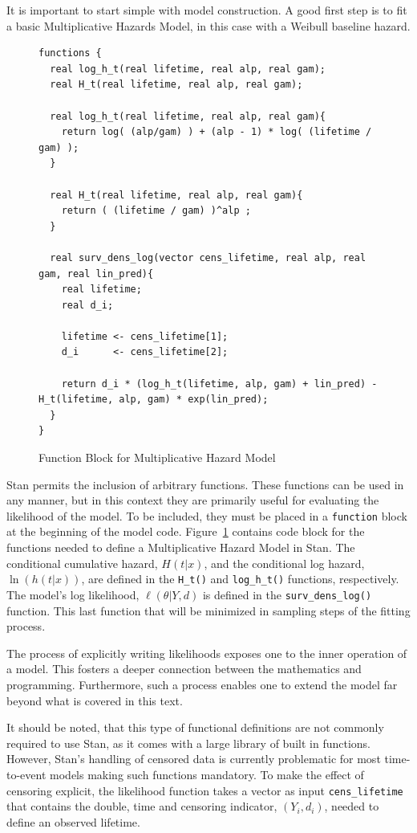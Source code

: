It is important to start simple with model construction. A good first step is to fit a basic Multiplicative Hazards Model, in this case with a Weibull baseline hazard. 

\begin{figure}[htbp]
    \centering
    \begin{lstlisting}[belowskip=-2 \baselineskip]
functions {
  real log_h_t(real lifetime, real alp, real gam);
  real H_t(real lifetime, real alp, real gam);
 
  real log_h_t(real lifetime, real alp, real gam){
    return log( (alp/gam) ) + (alp - 1) * log( (lifetime / gam) );
  }
  
  real H_t(real lifetime, real alp, real gam){
    return ( (lifetime / gam) )^alp ;
  }
  
  real surv_dens_log(vector cens_lifetime, real alp, real gam, real lin_pred){
    real lifetime;
    real d_i;
  
    lifetime <- cens_lifetime[1];
    d_i      <- cens_lifetime[2];
  
    return d_i * (log_h_t(lifetime, alp, gam) + lin_pred) - H_t(lifetime, alp, gam) * exp(lin_pred);
  }
}\end{lstlisting}
    \caption{Function Block for Multiplicative Hazard Model}
    \label{mhazm_funs}
\end{figure}


Stan permits the inclusion of arbitrary functions. These functions can be used in any manner, but in this context they are primarily useful for evaluating the likelihood of the model. To be included, they must be placed in a \lstinline{function} block at the beginning of the model code. Figure~\ref{mhazm_funs} contains code block for the functions needed to define a Multiplicative Hazard Model in Stan. The conditional cumulative hazard, $H(t|x)$, and the conditional log hazard, $\ln(h(t|x))$, are defined in the \lstinline{H_t()} and \lstinline{log_h_t()} functions, respectively. The model's log likelihood, $\ell(\theta|Y, d)$ is defined in the \lstinline{surv_dens_log()} function. This last function that will be minimized in sampling steps of the fitting process. 

The process of explicitly writing likelihoods exposes one to the inner operation of a model. This fosters a deeper connection between the mathematics and programming. Furthermore, such a process enables one to extend the model far beyond what is covered in this text.

It should be noted, that this type of functional definitions are not commonly required to use Stan, as it comes with a large library of built in functions\cite{StanDevelopmentTeam2016}. However, Stan's handling of censored data is currently problematic for most time-to-event models making such functions mandatory. To make the effect of censoring explicit, the likelihood function takes a vector as input \lstinline{cens_lifetime} that contains the double, time and censoring indicator, $(Y_i,d_i)$, needed to define an observed lifetime. 

